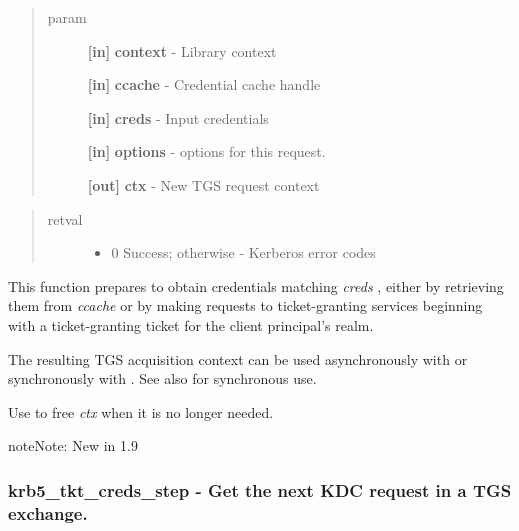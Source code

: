\documentclass[letterpaper,10pt,english]{sphinxmanual}
\begin{document}
\begin{quote}\begin{description}
\item[{param}] \leavevmode
\textbf{{[}in{]}} \textbf{context} - Library context

\textbf{{[}in{]}} \textbf{ccache} - Credential cache handle

\textbf{{[}in{]}} \textbf{creds} - Input credentials

\textbf{{[}in{]}} \textbf{options} -  options for this request.

\textbf{{[}out{]}} \textbf{ctx} - New TGS request context

\end{description}\end{quote}
\begin{quote}\begin{description}
\item[{retval}] \leavevmode\begin{itemize}
\item {} 
0   Success; otherwise - Kerberos error codes

\end{itemize}

\end{description}\end{quote}

This function prepares to obtain credentials matching \emph{creds} , either by retrieving them from \emph{ccache} or by making requests to ticket-granting services beginning with a ticket-granting ticket for the client principal's realm.

The resulting TGS acquisition context can be used asynchronously with {\hyperref[appdev/refs/api/krb5_tkt_creds_step:c.krb5_tkt_creds_step]{}} or synchronously with {\hyperref[appdev/refs/api/krb5_tkt_creds_get:c.krb5_tkt_creds_get]{}} . See also {\hyperref[appdev/refs/api/krb5_get_credentials:c.krb5_get_credentials]{}} for synchronous use.

Use {\hyperref[appdev/refs/api/krb5_tkt_creds_free:c.krb5_tkt_creds_free]{}} to free \emph{ctx} when it is no longer needed.

\begin{notice}{note}{Note:}
New in 1.9
\end{notice}


\subsubsection{krb5\_tkt\_creds\_step -  Get the next KDC request in a TGS exchange.}
\label{appdev/refs/api/krb5_tkt_creds_step:krb5-tkt-creds-step-get-the-next-kdc-request-in-a-tgs-exchange}\label{appdev/refs/api/krb5_tkt_creds_step::doc}
\end{document}

